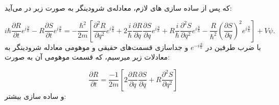 \documentclass[a4paper,titlepage,12pt,fleqn,oneside]{report}
\begin{document}
که پس از ساده سازی های لازم، معادله‌ی شرودینگر به صورت زیر در می‌آید:

\begin{equation}
i\hbar\frac{\partial R}{\partial t}e^{i \frac{S}{\hbar}}-R\frac{\partial S}{\partial t}e^{i \frac{S}{\hbar}} =-\frac{\hbar^2}{2m}\left[\frac{\partial^2 R}{\partial q^2} e^{i\frac{S}{h}}+2\frac{i}{\hbar}\frac{\partial R}{\partial q}\frac{\partial S}{\partial q} e^{i\frac{S}{h}}+R\frac{i}{\hbar}\frac{\partial^2 S}{\partial q^2} e^{i\frac{S}{h}}-\frac{R}{\hbar^2}\left(\frac{\partial S}{\partial q}\right)^2 e^{i\frac{S}{h}}
\right]+V\psi.
\end{equation}
با ضرب طرفین در $e^{-i\frac{S}{h}}$ و  جداسازی قسمت‌های حقیقی و موهومی معادله شرودینگر به معادلات زیر میرسیم، که قسمت موهومی آن به صورت:

\begin{equation}
\frac{\partial R}{\partial t} = \frac{-1}{2m} \left[2\frac{\partial R}{\partial q}\frac{\partial S}{\partial q}+R\frac{\partial^2 S}{\partial q^2}
\right]
\end{equation}
و ساده سازی بیشتر:
\end{document}
